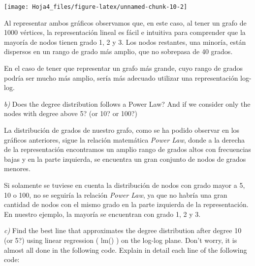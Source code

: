 \documentclass[
]{article}
\begin{document}
\begin{center}\texttt{[image: Hoja4\_files/figure-latex/unnamed-chunk-10-2]} \end{center}

Al representar ambos gráficos observamos que, en este caso, al tener un
grafo de 1000 vértices, la representación lineal es fácil e intuitiva
para comprender que la mayoría de nodos tienen grado 1, 2 y 3. Los nodos
restantes, una minoría, están dispersos en un rango de grado más amplio,
que no sobrepasa de 40 grados.

En el caso de tener que representar un grafo más grande, cuyo rango de
grados podría ser mucho más amplio, sería más adecuado utilizar una
representación log-log.

\emph{b)} Does the degree distribution follows a Power Law? And if we
consider only the nodes with degree above 5? (or 10? or 100?)

La distribución de grados de nuestro grafo, como se ha podido observar
en los gráficos anteriores, sigue la relación matemática \emph{Power
Law}, donde a la derecha de la representación encontramos un amplio
rango de grados altos con frecuencias bajas y en la parte izquierda, se
encuentra un gran conjunto de nodos de grados menores.

Si solamente se tuviese en cuenta la distribución de nodos con grado
mayor a 5, 10 o 100, no se seguiría la relación \emph{Power Law}, ya que
no habría una gran cantidad de nodos con el mismo grado en la parte
izquierda de la representación. En nuestro ejemplo, la mayoría se
encuentran con grado 1, 2 y 3.

\emph{c)} Find the best line that approximates the degree distribution
after degree 10 (or 5?) using linear regression ( lm() ) on the log-log
plane. Don't worry, it is almost all done in the following code. Explain
in detail each line of the following code:
\end{document}
